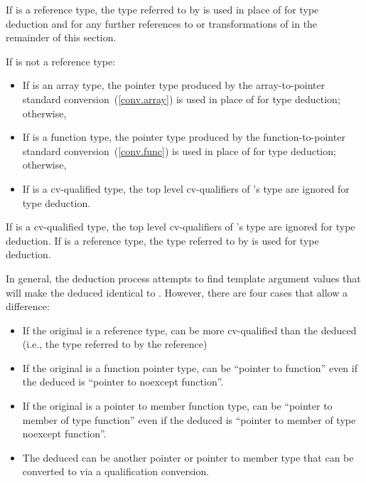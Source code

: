 \pnum
If  is a reference type, the type referred to by  is used in place
of  for type deduction and for any further references to or transformations of
 in the remainder of this section.

\pnum
If
is not a reference type:

\begin{itemize}
\item
If
is an array type, the pointer type produced by the
array-to-pointer standard conversion~(\ref{conv.array}) is used in place of
for type
deduction; otherwise,
\item
If
is a function type, the pointer type produced by the
function-to-pointer standard conversion~(\ref{conv.func}) is used in place of
for
type deduction; otherwise,
\item
If
is a cv-qualified type, the top level cv-qualifiers of
's
type are ignored for type deduction.
\end{itemize}

\pnum
If
is a cv-qualified type, the top level cv-qualifiers of
's
type are ignored for type deduction.
If
is a
reference type, the type referred to by
is used for type deduction.

\pnum
In general, the deduction process attempts to find template argument
values that will make the deduced
identical to
.
However, there are four cases that allow a difference:

\begin{itemize}
\item
If the original  is a reference type,
 can be more cv-qualified than the deduced 
(i.e., the type referred to by the reference)
\item
If the original  is a function pointer type,
 can be ``pointer to function''
even if the deduced  is ``pointer to noexcept function''.
\item
If the original  is a pointer to member function type,
 can be ``pointer to member of type function''
even if the deduced  is ``pointer to member of type noexcept function''.
\item
The deduced 
can be another pointer or pointer to member type that
can be converted to  via a qualification conversion.
\end{itemize}


